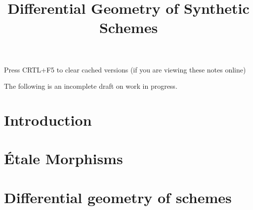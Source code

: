 \documentclass{../util/zariski}
\title{Differential Geometry of Synthetic Schemes}
\begin{document}
\maketitle

\begin{center}
  \color{purple}
  \large{Press CRTL+F5 to clear cached versions}
  \large{(if you are viewing these notes online)}
\end{center}

The following is an incomplete draft on work in progress.

\tableofcontents

\section*{Introduction}


\section{Étale Morphisms}


\section{Differential geometry of schemes}


\printindex

\printbibliography
\end{document}
